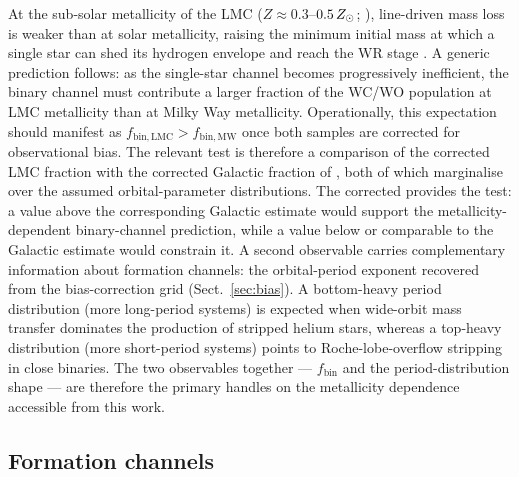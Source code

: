 At the sub-solar metallicity of the LMC ($Z \approx 0.3$--$0.5\,Z_\odot$;
\citealt{Russell1992}), line-driven mass loss is weaker than at solar
metallicity, raising the minimum initial mass at which a single star can
shed its hydrogen envelope and reach the WR stage \citep{Shenar2020}. A
generic prediction follows: as the single-star channel becomes
progressively inefficient, the binary channel must contribute a larger
fraction of the WC/WO population at LMC metallicity than at Milky Way
metallicity. Operationally, this expectation should manifest as
$f_\mathrm{bin,LMC} > f_\mathrm{bin,MW}$ once both samples are corrected
for observational bias. The relevant test is therefore a comparison of
the corrected LMC fraction \fbincorr with the corrected Galactic fraction
of \citet{Dsilva2023}, both of which marginalise over the assumed
orbital-parameter distributions. The corrected \fbincorr provides the
test: a value above the corresponding Galactic estimate would support
the metallicity-dependent binary-channel prediction, while a value
below or comparable to the Galactic estimate would constrain it.
A second observable carries complementary information about formation
channels: the orbital-period exponent \pibestfit recovered from the
bias-correction grid (Sect.~\ref{sec:bias}). A bottom-heavy period
distribution (more long-period systems) is expected when wide-orbit mass
transfer dominates the production of stripped helium stars, whereas a
top-heavy distribution (more short-period systems) points to
Roche-lobe-overflow stripping in close binaries. The two observables
together --- $f_\mathrm{bin}$ and the period-distribution shape --- are
therefore the primary handles on the metallicity dependence accessible
from this work.

\subsection{Formation channels}
\label{sec:formation}


